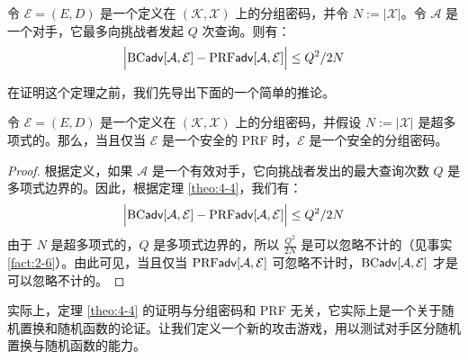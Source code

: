 \begin{theorem}\label{theo:4-4}
令 $\mathcal{E}=(E,D)$ 是一个定义在 $(\mathcal{K},\mathcal{X})$ 上的分组密码，并令 $N:=|\mathcal{X}|$。令 $\mathcal{A}$ 是一个对手，它最多向挑战者发起 $Q$ 次查询。则有：
\[
\Big\lvert
{\rm BC\mathsf{adv}}[\mathcal{A},\mathcal{E}]-{\rm PRF\mathsf{adv}}[\mathcal{A},\mathcal{E}]
\Big\rvert
\leq{Q^2}/{2N}
\]
\end{theorem}

在证明这个定理之前，我们先导出下面的一个简单的推论。

\begin{corollary}\label{cor:4-5}
令 $\mathcal{E}=(E,D)$ 是一个定义在 $(\mathcal{K},\mathcal{X})$ 上的分组密码，并假设 $N:=|\mathcal{X}|$ 是超多项式的。那么，当且仅当 $\mathcal{E}$ 是一个安全的 PRF 时，$\mathcal{E}$ 是一个安全的分组密码。
\end{corollary}

\begin{proof}
根据定义，如果 $\mathcal{A}$ 是一个有效对手，它向挑战者发出的最大查询次数 $Q$ 是多项式边界的。因此，根据定理 \ref{theo:4-4}，我们有：
\[
\Big\lvert
{\rm BC\mathsf{adv}}[\mathcal{A},\mathcal{E}]-{\rm PRF\mathsf{adv}}[\mathcal{A},\mathcal{E}]
\Big\rvert
\leq{Q^2}/{2N}
\]
由于 $N$ 是超多项式的，$Q$ 是多项式边界的，所以 $\frac{Q^2}{2N}$ 是可以忽略不计的（见事实 \ref{fact:2-6}）。由此可见，当且仅当 ${\rm PRF\mathsf{adv}}[\mathcal{A},\mathcal{E}]$ 可忽略不计时，${\rm BC\mathsf{adv}}[\mathcal{A},\mathcal{E}]$ 才是可以忽略不计的。
\end{proof}

实际上，定理 \ref{theo:4-4} 的证明与分组密码和 PRF 无关，它实际上是一个关于随机置换和随机函数的论证。让我们定义一个新的攻击游戏，用以测试对手区分随机置换与随机函数的能力。

